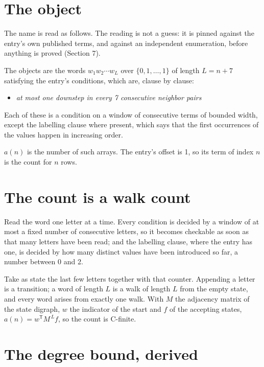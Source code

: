 \documentclass[11pt]{article}
\theoremstyle{definition}
\begin{document}
\section{The object}

The name is read as follows. The reading is not a guess: it is pinned against the entry's own published terms, and against an independent enumeration, before anything is proved (Section 7).

The objects are the words $w_1 w_2 \cdots w_L$ over $\{0,1,\dots,1\}$ of length $L = n + 7$ satisfying the entry's conditions, which are, clause by clause:

\begin{itemize}

\item {\itshape at most one downstep in every 7 consecutive neighbor pairs}

\end{itemize}

Each of these is a condition on a window of consecutive terms of bounded width, except the labelling clause where present, which says that the first occurrences of the values happen in increasing order.

$a(n)$ is the number of such arrays. The entry's offset is 1, so its term of index $n$ is the count for $n$ rows.

\section{The count is a walk count}

Read the word one letter at a time. Every condition is decided by a window of at most a fixed number of consecutive letters, so it becomes checkable as soon as that many letters have been read; and the labelling clause, where the entry has one, is decided by how many distinct values have been introduced so far, a number between $0$ and 2.

Take as state the last few letters together with that counter. Appending a letter is a transition; a word of length $L$ is a walk of length $L$ from the empty state, and every word arises from exactly one walk. With $M$ the adjacency matrix of the state digraph, $w$ the indicator of the start and $f$ of the accepting states, $a(n) = w^{\mathsf T}M^{\,L}f$, so the count is C-finite.

\section{The degree bound, derived}
\end{document}
